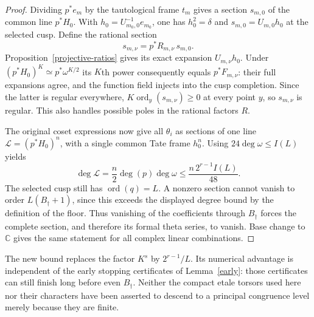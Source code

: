 \documentclass[11pt]{article}
\theoremstyle{remark}\newtheorem{remark}[theorem]{Remark}
\newcommand{\C}{\mathbb C}\newcommand{\OO}{\mathcal O}
\DeclareMathOperator{\ord}{ord}\DeclareMathOperator{\diag}{diag}
\begin{document}
\begin{proof}
Dividing $p^*e_m$ by the tautological frame $t_m$ gives a section
$s_{m,0}$ of the common line $p^*H_0$. With
$h_0=U_{m_0,0}^{-1}e_{m_0}$, one has $h_0^2=\delta$ and
$s_{m,0}=U_{m,0}h_0$ at the selected cusp. Define the rational section
\[
 s_{m,\nu}=p^*R_{m,\nu}\,s_{m,0}.
\]
Proposition~\ref{projective-ratios} gives its exact expansion
$U_{m,\nu}h_0$. Under $(p^*H_0)^K\simeq p^*\omega^{K/2}$ its
$K$th power consequently equals $p^*F_{m,\nu}$: their full
expansions agree, and the function field injects into the cusp
completion. Since the latter is regular everywhere,
$K\ord_y(s_{m,\nu})\geq0$ at every point $y$, so $s_{m,\nu}$ is
regular. This also handles possible poles in the rational factors $R$.

The original coset expressions now give all $\theta_i$ as sections of
one line $\mathcal L=(p^*H_0)^n$, with a single common Tate frame
$h_0^n$. Using $24\deg\omega\leq I(L)$ yields
\[
 \deg\mathcal L=\frac n2\deg(p)\deg\omega
       \leq\frac{n\,2^{r-1}I(L)}{48}.
\]
The selected cusp still has $\ord(q)=L$. A nonzero section cannot
vanish to order $L(B_\dagger+1)$, since this exceeds the displayed
degree bound by the definition of the floor. Thus vanishing of the
coefficients through $B_\dagger$ forces the complete section, and
therefore its formal theta series, to vanish. Base change to $\C$
gives the same statement for all complex linear combinations.
\end{proof}

The new bound replaces the factor $K^s$ by $2^{r-1}/L$. Its numerical
advantage is independent of the early stopping certificates of
Lemma~\ref{early}: those certificates can still finish long
before even $B_\dagger$. Neither the compact etale torsors used here
nor their characters have been asserted to descend to a principal
congruence level merely because they are finite.
\end{document}
